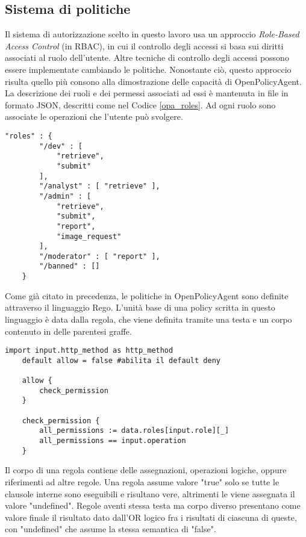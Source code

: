 \subsection{Sistema di politiche}
Il sistema di autorizzazione scelto in questo lavoro usa un approccio \textit{Role-Based Access Control} (in RBAC), in cui il 
controllo degli accessi si basa sui diritti associati al ruolo dell'utente. 
Altre tecniche di controllo degli accessi possono essere implementate cambiando le politiche. Nonostante ciò, 
questo approccio risulta quello più consono alla dimostrazione delle capacità di OpenPolicyAgent.
\\ La descrizione dei ruoli e dei permessi associati ad essi è mantenuta in file in formato JSON, descritti come nel Codice \ref*{opa_roles}.
Ad ogni ruolo sono associate le operazioni che l'utente può svolgere.
\lstset{language=nginx}
\begin{lstlisting}[caption={Descrizione dei ruoli},captionpos=b,label=opa_roles]
    "roles" : {
        "/dev" : [
            "retrieve", 
            "submit"
        ],
        "/analyst" : [ "retrieve" ],
        "/admin" : [ 
            "retrieve", 
            "submit",
            "report",
            "image_request"
        ],
        "/moderator" : [ "report" ], 
        "/banned" : []
    }
\end{lstlisting}
Come già citato in precedenza, le politiche in OpenPolicyAgent sono definite attraverso il linguaggio Rego. L'unità base di una policy scritta in questo linguaggio è data 
dalla regola, che viene definita tramite una testa e un corpo contenuto in delle parentesi graffe. 
\begin{lstlisting}[caption={Policy in linguaggio Rego},captionpos=b,label=opa_policy]
    import input.http_method as http_method   
    default allow = false #abilita il default deny

    allow {
        check_permission
    }

    check_permission {
        all_permissions := data.roles[input.role][_]
        all_permissions == input.operation
    }
\end{lstlisting}
Il corpo di una regola contiene delle assegnazioni, operazioni logiche, oppure riferimenti ad altre regole. Una regola assume valore "true" 
solo se tutte le clausole interne sono eseguibili e risultano vere, altrimenti le viene assegnata il valore "undefined". Regole aventi stessa testa ma corpo diverso presentano come valore finale 
il risultato dato dall'OR logico fra i risultati di ciascuna di queste, con "undefined" che assume la stessa semantica di "false". 
